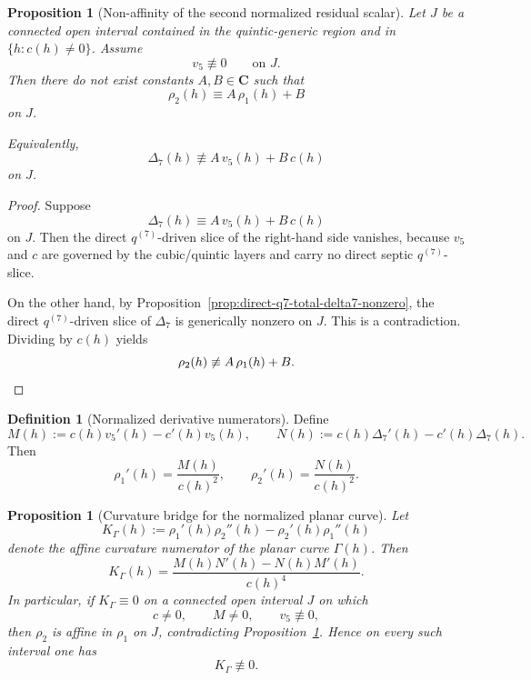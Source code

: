 \documentclass[11pt,a4paper]{amsart}
\theoremstyle{plain}
\newtheorem{proposition}[theorem]{Proposition}
\theoremstyle{definition}
\newtheorem{definition}[theorem]{Definition}
\begin{document}
\begin{proposition}[Non-affinity of the second normalized residual scalar]
\label{prop:rho2-not-affine-in-rho1}
Let $J$ be a connected open interval contained in the quintic-generic region
and in $\{h:c(h)\neq 0\}$. Assume
\[
v_5\not\equiv 0
\qquad\text{on }J.
\]
Then there do not exist constants $A,B\in\mathbf C$ such that
\[
\rho_2(h)\equiv A\,\rho_1(h)+B
\]
on $J$.

Equivalently,
\[
\Delta_7(h)\not\equiv A\,v_5(h)+B\,c(h)
\]
on $J$.
\end{proposition}

\begin{proof}
Suppose
\[
\Delta_7(h)\equiv A\,v_5(h)+B\,c(h)
\]
on $J$. Then the direct $q^{(7)}$-driven slice of the right-hand side
vanishes, because $v_5$ and $c$ are governed by the cubic/quintic layers
and carry no direct septic $q^{(7)}$-slice.

On the other hand, by
Proposition~\ref{prop:direct-q7-total-delta7-nonzero}, the direct
$q^{(7)}$-driven slice of $\Delta_7$ is generically nonzero on $J$.
This is a contradiction. Dividing by $c(h)$ yields
\[
\rho_2(h)\not\equiv A\,\rho_1(h)+B.
\qedhere
\]
\end{proof}

\begin{definition}[Normalized derivative numerators]
\label{def:MN-normalized-curve}
Define
\[
M(h):=c(h)v_5'(h)-c'(h)v_5(h),
\qquad
N(h):=c(h)\Delta_7'(h)-c'(h)\Delta_7(h).
\]
Then
\[
\rho_1'(h)=\frac{M(h)}{c(h)^2},
\qquad
\rho_2'(h)=\frac{N(h)}{c(h)^2}.
\]
\end{definition}

\begin{proposition}[Curvature bridge for the normalized planar curve]
\label{prop:curvature-bridge-normalized-curve}
Let
\[
K_\Gamma(h):=\rho_1'(h)\rho_2''(h)-\rho_2'(h)\rho_1''(h)
\]
denote the affine curvature numerator of the planar curve $\Gamma(h)$.
Then
\[
K_\Gamma(h)=\frac{M(h)N'(h)-N(h)M'(h)}{c(h)^4}.
\]
In particular, if $K_\Gamma\equiv 0$ on a connected open interval $J$ on
which
\[
c\neq 0,
\qquad
M\neq 0,
\qquad
v_5\not\equiv 0,
\]
then $\rho_2$ is affine in $\rho_1$ on $J$, contradicting
Proposition~\ref{prop:rho2-not-affine-in-rho1}. Hence on every such interval
one has
\[
K_\Gamma\not\equiv 0.
\]
\end{proposition}
\end{document}
